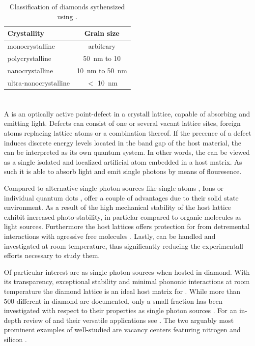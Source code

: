     \begin{table}[htbp]
  		\centering
  		\caption[Classification of diamond synthesized by \cvd]{Classification of diamonds sythensized using \CVD \cite{steinmetz::thesis}.} \label{tab::diamond_grain_sizes}
  			\begin{tabular}{lc}
  			\toprule
  			Crystallity & Grain size  \\
  			\midrule
  			monocrystalline & arbitrary \\
  			polycrystalline & \SI{50}{\nm} to \SI{10}{\mum} \\
  			nanocrystalline & \SI{10}{\nm} to \SI{50}{\nm} \\
  			ultra-nanocrystalline & $<$ \SI{10}{\nm} \\
  			\bottomrule
  			\end{tabular}
  	\end{table}

\section{\sivs} \label{sec::siv}

  A \cc is an optically active point-defect in a crystall lattice, capable of absorbing and emitting light. Defects can consist of one or several vacant lattice sites, foreign atoms replacing lattice atoms or a combination thereof. If the precence of a defect induces discrete energy levels located in the band gap of the host material, the \cc can be interpreted as its own quantum system. In other words, the \cc can be viewed as a single isolated and localized artificial atom embedded in a host matrix. As such it is able to absorb light and emit single photons by means of flouresence.

  Compared to alternative single photon sources like single atoms \cite{steinmetz::27}, Ions \cite{steinmetz::29} or individual quantum dots \cite{steinmetz::32, steinmetz::34}, \ccs offer a couple of advantages due to their solid state environment. As a result of the high mechanical stability of the host lattice \ccs exhibit increased photo-stability, in particlar compared to organic molecules as light sources. Furthermore the host lattices offers protection for \ccs from detremental interactions with agressive free molecules \cite{steimetz::36}. Lastly, \ccs can be handled and investigated at room temperature, thus significantly reducing the experimentall efforts necessary to study them.

  Of particular interest are \ccs as single photon sources when hosted in diamond. With its transparency, exceptional stability and minimal phononic interactions at room temperature the diamond lattice is an ideal host matrix for \ccs \cite{steinmetz::70,steinmetz::71}. While more than $500$ different \ccs in diamond are documented, only a small fraction has been investigated with respect to their properties as single photon sources \cite{steinmetz::58}. For an in-depth review of \ccs and their versatile applications see \cite{janine::64, janine::153}. The two arguably most prominent examples of well-studied \ccs are vacancy centers featuring nitrogen and silicon \cite{janine::165, janine::166, janine::167}.

